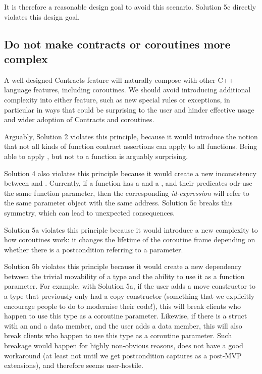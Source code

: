 It is therefore a reasonable design goal to avoid this scenario. Solution 5c directly violates this design goal.

\subsection{Do not make contracts or coroutines more complex}

A well-designed Contracts feature will naturally compose with other C++ language features, including coroutines. We should avoid introducing additional complexity into either feature, such as new special rules or exceptions, in particular in ways that could be surprising to the user and hinder effective usage and wider adoption of Contracts and coroutines.

Arguably, Solution 2 violates this principle, because it would introduce the notion that not all kinds of function contract assertions can apply to all functions. Being able to apply , but not  to a function is arguably surprising.

Solution 4 also violates this principle because it would create a new inconsistency between  and . Currently, if a function has a  and a , and their predicates odr-use the same function parameter, then the corresponding \emph{id-expression} will refer to the same parameter object with the same address. Solution 5c breaks this symmetry, which can lead to unexpected consequences.

Solution 5a violates this principle because it would introduce a new complexity to how coroutines work: it changes the lifetime of the coroutine frame depending on whether there is a postcondition referring to a parameter.

Solution 5b violates this principle because it would create a new dependency between the trivial movability of a type and the ability to use it as a function parameter. For example, with Solution 5a, if the user adds a move constructor to a type that previously only had a copy constructor (something that we explicitly encourage people to do to modernise their code!), this will break clients who happen to use this type as a coroutine parameter. Likewise, if there is a struct with an  and a  data member, and the user adds a  data member, this will also break clients who happen to use this type as a coroutine parameter. Such breakage would happen for highly non-obvious reasons, does not have a good workaround (at least not until we get postcondition captures as a post-MVP extensions), and therefore seems user-hostile. 

